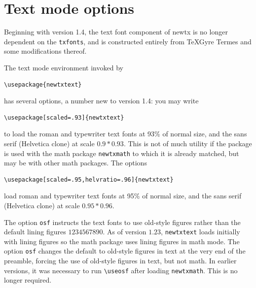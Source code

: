 \documentclass[\fsc]{article}
\theoremstyle{oldplain}
\theoremstyle{plain}
\begin{document}
\section{Text mode options}
Beginning with version 1.4, the text font component of \textsf{newtx} is no longer dependent on the {\tt txfonts}, and is constructed entirely from \textsf{TeXGyre Termes} and some modifications thereof.

The text mode environment invoked by
\begin{verbatim}
\usepackage{newtxtext}
\end{verbatim}
has several options, a number new to version 1.4: you may write
\begin{verbatim}
\usepackage[scaled=.93]{newtxtext}
\end{verbatim}
to load the roman and typewriter text fonts at 93\% of normal size, and the sans serif (\textsf{Helvetica} clone) at scale $0.9*0.93$. This is not of much utility if the package is used with the math package {\tt newtxmath} to which it is already matched, but may be with other math packages. The options
\begin{verbatim}
\usepackage[scaled=.95,helvratio=.96]{newtxtext}
\end{verbatim}
load roman and typewriter text fonts at 95\% of normal size, and the sans serif (\textsf{Helvetica} clone) at scale $0.95*0.96$.

The option \texttt{osf} instructs the text fonts to use old-style figures  rather than the default lining figures $1234567890$. As of version $1.23$, {\tt newtxtext} loads initially with lining figures so the math package uses lining figures in math mode. The option {\tt osf} changes the default to old-style figures in text at the very end of the preamble, forcing the use of old-style figures in text, but not math. In earlier versions, it was necessary to run 
\verb|\useosf| after loading {\tt newtxmath}. This is no longer required. 
\end{document}
